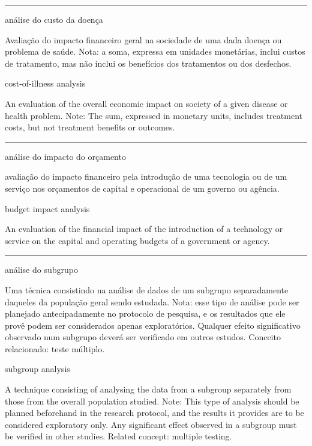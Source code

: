 \documentclass[
  openany]{book}
\begin{document}
\begin{center}\rule{0.5\linewidth}{0.5pt}\end{center}

análise do custo da doença

Avaliação do impacto financeiro geral na sociedade de uma dada doença ou problema de saúde. Nota: a soma, expressa em unidades monetárias, inclui custos de tratamento, mas não inclui os benefícios dos tratamentos ou dos desfechos.

cost-of-illness analysis

An evaluation of the overall economic impact on society of a given disease or health problem. Note: The sum, expressed in monetary units, includes treatment costs, but not treatment benefits or outcomes.

\begin{center}\rule{0.5\linewidth}{0.5pt}\end{center}

análise do impacto do orçamento

avaliação do impacto financeiro pela introdução de uma tecnologia ou de um serviço nos orçamentos de capital e operacional de um governo ou agência.

budget impact analysis

An evaluation of the financial impact of the introduction of a technology or service on the capital and operating budgets of a government or agency.

\begin{center}\rule{0.5\linewidth}{0.5pt}\end{center}

análise do subgrupo

Uma técnica consistindo na análise de dados de um subgrupo separadamente daqueles da população geral sendo estudada. Nota: esse tipo de análise pode ser planejado antecipadamente no protocolo de pesquisa, e os resultados que ele provê podem ser considerados apenas exploratórios. Qualquer efeito significativo observado num subgrupo deverá ser verificado em outros estudos. Conceito relacionado: teste múltiplo.

subgroup analysis

A technique consisting of analysing the data from a subgroup separately from those from the overall population studied. Note: This type of analysis should be planned beforehand in the research protocol, and the results it provides are to be considered exploratory only. Any significant effect observed in a subgroup must be verified in other studies. Related concept: multiple testing.
\end{document}
